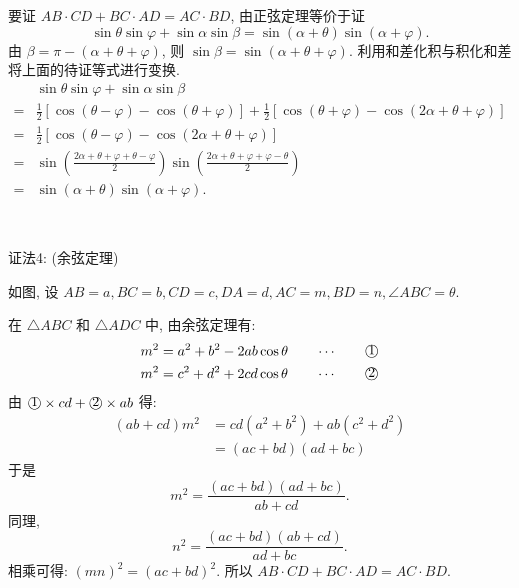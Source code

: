要证 $AB\cdot CD + BC\cdot AD = AC\cdot BD$, 由正弦定理等价于证
\[\sin\theta \sin\varphi + \sin\alpha \sin\beta = \sin(\alpha+\theta)\sin(\alpha+\varphi).\]
由 $\beta = \pi - (\alpha+\theta+\varphi)$, 则 $\sin\beta = \sin(\alpha+\theta+\varphi)$. 利用和差化积与积化和差将上面的待证等式进行变换.
\begin{align*}
& \sin\theta \sin\varphi + \sin\alpha \sin\beta \\
=& \frac{1}{2}\left[\cos(\theta-\varphi) - \cos(\theta+\varphi)\right]+\frac{1}{2}\left[\cos(\theta+\varphi) - \cos(2\alpha+\theta+\varphi)\right]\\
=& \frac{1}{2}\left[\cos(\theta-\varphi) - \cos(2\alpha+\theta+\varphi)\right]\\
=& \sin(\frac{2\alpha+\theta+\varphi+\theta-\varphi}{2})\sin(\frac{2\alpha+\theta+\varphi+\varphi-\theta}{2})\\
=& \sin(\alpha+\theta)\sin(\alpha+\varphi).
\end{align*}

~

证法4: (余弦定理)
\begin{figure*}[htbp]
\centering
{}
\end{figure*}

如图, 设 $AB=a, BC=b, CD=c, DA=d, AC=m, BD=n, \angle ABC=\theta$.

在 $\triangle ABC$ 和 $\triangle ADC$ 中, 由余弦定理有:
\begin{align*}
m^2 &= a^2+b^2-2ab\cos\theta \qquad\cdots\qquad \raisebox{.5pt}{\textcircled{\raisebox{0pt} {1}}} \\
m^2 &= c^2+d^2+2cd\cos\theta \qquad\cdots\qquad \raisebox{.5pt}{\textcircled{\raisebox{0pt} {2}}}
\end{align*}
由 $\raisebox{.5pt}{\textcircled{\raisebox{0pt} {1}}}\times cd + \raisebox{.5pt}{\textcircled{\raisebox{0pt} {2}}}\times ab$ 得:
\begin{align*} 
(ab+cd)m^2 &= cd(a^2+b^2)+ab(c^2+d^2) \\
&= (ac+bd)(ad+bc)
\end{align*}
于是
\[ m^2 = \frac{(ac+bd)(ad+bc)}{ab+cd} .\]
同理, 
\[n^2 =  \dfrac{(ac+bd)(ab+cd)}{ad+bc} .\]
相乘可得: $(mn)^2=(ac+bd)^2$. 所以 $AB\cdot CD+BC\cdot AD=AC\cdot BD$.

